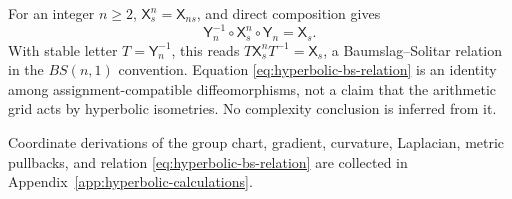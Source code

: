 \begin{remark}\label{rem:hyperbolic-bs-relation}
For an integer \(n\ge2\),
\(\mathsf X_s^n=\mathsf X_{ns}\), and direct composition gives
\begin{equation}\label{eq:hyperbolic-bs-relation}
 \mathsf Y_n^{-1}\circ\mathsf X_s^n\circ\mathsf Y_n
 =\mathsf X_s.
\end{equation}
With stable letter \(T=\mathsf Y_n^{-1}\), this reads
\(T\mathsf X_s^nT^{-1}=\mathsf X_s\), a
Baumslag--Solitar relation in the \(BS(n,1)\) convention.  Equation
\eqref{eq:hyperbolic-bs-relation} is an identity among
assignment-compatible diffeomorphisms, not a claim that the arithmetic grid acts
by hyperbolic isometries.  No complexity conclusion is inferred from it.
\end{remark}

Coordinate derivations of the group chart, gradient, curvature, Laplacian, metric
pullbacks, and relation \eqref{eq:hyperbolic-bs-relation} are collected in
Appendix~\ref{app:hyperbolic-calculations}.
